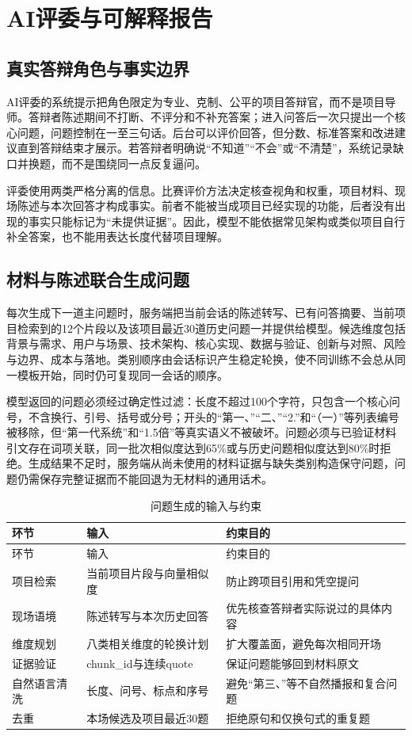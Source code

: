 \chapter{AI评委与可解释报告}
\section{真实答辩角色与事实边界}
AI评委的系统提示把角色限定为专业、克制、公平的项目答辩官，而不是项目导师。答辩者陈述期间不打断、不评分和不补充答案；进入问答后一次只提出一个核心问题，问题控制在一至三句话。后台可以评价回答，但分数、标准答案和改进建议直到答辩结束才展示。若答辩者明确说“不知道”“不会”或“不清楚”，系统记录缺口并换题，而不是围绕同一点反复逼问。

评委使用两类严格分离的信息。比赛评价方法决定核查视角和权重，项目材料、现场陈述与本次回答才构成事实。前者不能被当成项目已经实现的功能，后者没有出现的事实只能标记为“未提供证据”。因此，模型不能依据常见架构或类似项目自行补全答案，也不能用表达长度代替项目理解。

\section{材料与陈述联合生成问题}
每次生成下一道主问题时，服务端把当前会话的陈述转写、已有问答摘要、当前项目检索到的12个片段以及该项目最近30道历史问题一并提供给模型。候选维度包括背景与需求、用户与场景、技术架构、核心实现、数据与验证、创新与对照、风险与边界、成本与落地。类别顺序由会话标识产生稳定轮换，使不同训练不会总从同一模板开始，同时仍可复现同一会话的顺序。

模型返回的问题必须经过确定性过滤：长度不超过100个字符，只包含一个核心问号，不含换行、引号、括号或分号；开头的“第一、”“二、”“2.”和“（一）”等列表编号被移除，但“第一代系统”和“1.5倍”等真实语义不被破坏。问题必须与已验证材料引文存在词项关联，同一批次相似度达到65\%或与历史问题相似度达到80\%时拒绝。生成结果不足时，服务端从尚未使用的材料证据与缺失类别构造保守问题，问题仍需保存完整证据而不能回退为无材料的通用话术。

\begin{longtable}{p{3.1cm}p{4.0cm}p{7.0cm}}
\caption{问题生成的输入与约束}\\
\toprule 环节 & 输入 & 约束目的 \\
\midrule
\endfirsthead
\toprule 环节 & 输入 & 约束目的 \\
\midrule
\endhead
项目检索 & 当前项目片段与向量相似度 & 防止跨项目引用和凭空提问 \\
现场语境 & 陈述转写与本次历史回答 & 优先核查答辩者实际说过的具体内容 \\
维度规划 & 八类相关维度的轮换计划 & 扩大覆盖面，避免每次相同开场 \\
证据验证 & chunk\_id与连续quote & 保证问题能够回到材料原文 \\
自然语言清洗 & 长度、问号、标点和序号 & 避免“第三、”等不自然播报和复合问题 \\
去重 & 本场候选及项目最近30题 & 拒绝原句和仅换句式的重复题 \\
\bottomrule
\end{longtable}

